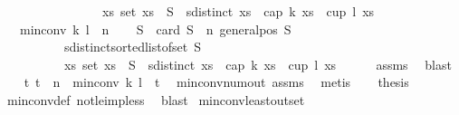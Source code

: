 \begin{isabellebody}
\ \ \ \ \ \ \ \ \ \ \ \ \ \ \ \ {\isacharparenleft}{\kern0pt}{\isasymforall}xs{\isachardot}{\kern0pt}\ set\ xs\ {\isasymsubseteq}\ S\ {\isasymand}\ sdistinct\ xs\ {\isasymlongrightarrow}\ {\isasymnot}{\isacharparenleft}{\kern0pt}cap\ k\ xs\ {\isasymor}\ cup\ l\ xs{\isacharparenright}{\kern0pt}{\isacharparenright}{\kern0pt}{\isachardoublequoteclose}\isanewline
\ \ \ {\isachardoublequoteopen}min{\isacharunderscore}{\kern0pt}conv\ k\ l\ {\isachargreater}{\kern0pt}\ n{\isachardoublequoteclose}\isanewline
%
\isadelimproof
%
\endisadelimproof
%
\isatagproof
{}\isamarkupfalse%
{\isacharminus}{\kern0pt}\isanewline
\ \ \isamarkupfalse%
\ S\ \ {\isachardoublequoteopen}card\ S\ {\isasymge}\ n{\isachardoublequoteclose}\ {\isachardoublequoteopen}general{\isacharunderscore}{\kern0pt}pos\ S{\isachardoublequoteclose}\ \isanewline
\ \ \ \ \ \ \ \ \ \ {\isachardoublequoteopen}sdistinct{\isacharparenleft}{\kern0pt}sorted{\isacharunderscore}{\kern0pt}list{\isacharunderscore}{\kern0pt}of{\isacharunderscore}{\kern0pt}set\ S{\isacharparenright}{\kern0pt}{\isachardoublequoteclose}\ \isanewline
\ \ \ \ \ \ \ \ \ \ {\isachardoublequoteopen}{\isasymforall}xs{\isachardot}{\kern0pt}\ set\ xs\ {\isasymsubseteq}\ S\ {\isasymand}\ sdistinct\ xs\ {\isasymlongrightarrow}\ {\isasymnot}{\isacharparenleft}{\kern0pt}cap\ k\ xs\ {\isasymor}\ cup\ l\ xs{\isacharparenright}{\kern0pt}{\isachardoublequoteclose}\isanewline
\ \ \ \ \isamarkupfalse%
\ assms\ \isamarkupfalse%
\ blast\isanewline
\ \ \isamarkupfalse%
\ {\isachardoublequoteopen}{\isasymforall}t{\isachardot}{\kern0pt}\ t\ {\isasymle}\ n\ {\isasymlongrightarrow}\ min{\isacharunderscore}{\kern0pt}conv\ k\ l\ {\isasymnoteq}\ t{\isachardoublequoteclose}\ \isamarkupfalse%
\ min{\isacharunderscore}{\kern0pt}conv{\isacharunderscore}{\kern0pt}num{\isacharunderscore}{\kern0pt}out\ assms\ \isamarkupfalse%
\ metis\isanewline
\ \ \isamarkupfalse%
\ {\isacharquery}{\kern0pt}thesis\ \isamarkupfalse%
\ min{\isacharunderscore}{\kern0pt}conv{\isacharunderscore}{\kern0pt}def\ not{\isacharunderscore}{\kern0pt}le{\isacharunderscore}{\kern0pt}imp{\isacharunderscore}{\kern0pt}less\ \isamarkupfalse%
\ blast\isanewline
{}\isamarkupfalse%
%
\endisatagproof
{\isafoldproof}%
%
\isadelimproof
\isanewline
%
\endisadelimproof
\isanewline
{}\isamarkupfalse%
\ min{\isacharunderscore}{\kern0pt}conv{\isacharunderscore}{\kern0pt}least{\isacharunderscore}{\kern0pt}out{\isacharunderscore}{\kern0pt}set{\isacharcolon}{\kern0pt}\isanewline

\end{isabellebody}
